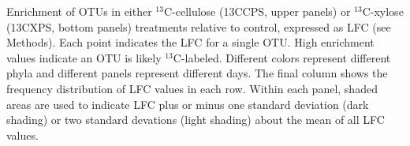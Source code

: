 Enrichment of OTUs in either $^{13}$C-cellulose (13CCPS, upper panels) or $^{13}$C-xylose (13CXPS, bottom panels) 
treatments relative to control, expressed as LFC (see Methods). Each point indicates the LFC for a single OTU. High
enrichment values indicate an OTU is likely $^{13}$C-labeled. Different colors
represent different phyla and different panels represent different days. The
final column shows the frequency distribution of LFC values in each row. Within
each panel, shaded areas are used to indicate LFC plus or minus one standard
deviation (dark shading) or two standard devations (light shading) about the
mean of all LFC values.
